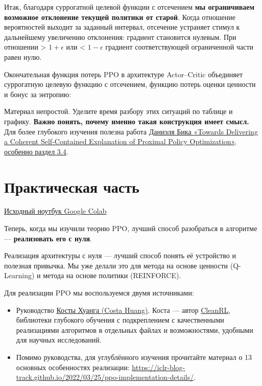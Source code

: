 \documentclass[11pt,a4paper]{article}
\begin{document}
Итак, благодаря суррогатной целевой функции с отсечением \textbf{мы ограничиваем возможное отклонение текущей политики от старой}. Когда отношение вероятностей выходит за заданный интервал, отсечение устраняет стимул к дальнейшему увеличению отклонения: градиент становится нулевым. При отношении \textgreater{} \(1 + \epsilon\) или \textless{} \(1 - \epsilon\) градиент соответствующей ограниченной части равен нулю.

Окончательная функция потерь PPO в архитектуре Actor–Critic объединяет суррогатную целевую функцию с отсечением, функцию потерь оценки ценности и бонус за энтропию:


Материал непростой. Уделите время разбору этих ситуаций по таблице и графику. \textbf{Важно понять, почему именно такая конструкция имеет смысл.} Для более глубокого изучения полезна работа \href{https://fse.studenttheses.ub.rug.nl/25709/1/mAI_2021_BickD.pdf}{Даниэля Бика «Towards Delivering a Coherent Self-Contained Explanation of Proximal Policy Optimization», особенно раздел 3.4}.

\section{Практическая часть}\label{hands-on}

\href{https://colab.research.google.com/github/huggingface/deep-rl-class/blob/main/notebooks/unit8/unit8_part1.ipynb}{Исходный ноутбук Google Colab}

Теперь, когда мы изучили теорию PPO, лучший способ разобраться в алгоритме --- \textbf{реализовать его с нуля}.

Реализация архитектуры с нуля --- лучший способ понять её устройство и полезная привычка. Мы уже делали это для метода на основе ценности (Q-Learning) и метода на основе политики (REINFORCE).

Для реализации PPO мы воспользуемся двумя источниками:

\begin{itemize}
\tightlist
\item
  Руководство \href{https://github.com/vwxyzjn}{Косты Хуанга (Costa Huang)}. Коста --- автор \href{https://github.com/vwxyzjn/cleanrl}{CleanRL}, библиотеки глубокого обучения с подкреплением с качественными реализациями алгоритмов в отдельных файлах и возможностями, удобными для научных исследований.
\item
  Помимо руководства, для углублённого изучения прочитайте материал о 13 основных особенностях реализации: \url{https://iclr-blog-track.github.io/2022/03/25/ppo-implementation-details/}.
\end{itemize}
\end{document}

